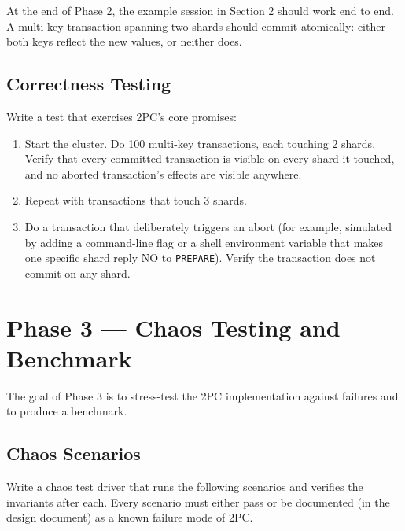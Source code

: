 \documentclass[11pt,a4paper]{article}
\begin{document}
At the end of Phase 2, the example session in Section 2 should work end to end. A multi-key transaction spanning two shards should commit atomically: either both keys reflect the new values, or neither does.

\subsection{Correctness Testing}
Write a test that exercises 2PC's core promises:

\begin{enumerate}
\item Start the cluster. Do 100 multi-key transactions, each touching 2 shards. Verify that every committed transaction is visible on every shard it touched, and no aborted transaction's effects are visible anywhere.

\item Repeat with transactions that touch 3 shards.

\item Do a transaction that deliberately triggers an abort (for example, simulated by adding a command-line flag or a shell environment variable that makes one specific shard reply NO to \texttt{PREPARE}). Verify the transaction does not commit on any shard.
\end{enumerate}

\section{Phase 3 --- Chaos Testing and Benchmark}

The goal of Phase 3 is to stress-test the 2PC implementation against failures and to produce a benchmark.

\subsection{Chaos Scenarios}
Write a chaos test driver that runs the following scenarios and verifies the invariants after each. Every scenario must either pass or be documented (in the design document) as a known failure mode of 2PC.
\end{document}
